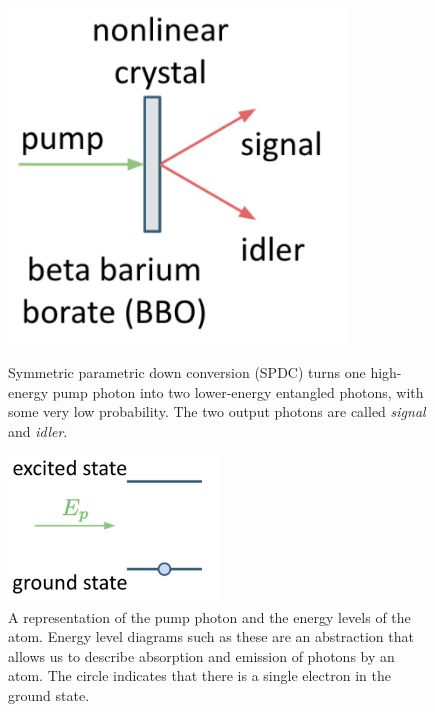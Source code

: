 \begin{figure}[H]
    \centering
    \includegraphics[width=0.8\textwidth]{lesson4/pump.pdf}
    \label{fig:spdc}
    
        \caption[Symmetric parametric down conversion (SPDC)]{Symmetric parametric down conversion (SPDC) turns one high-energy pump photon into two lower-energy entangled photons, with some very low probability. The two output photons are called \emph{signal} and \emph{idler}.}
    
\end{figure}

\begin{figure}[H]
    \centering
    \includegraphics[width=0.5\textwidth]{lesson4/state1.pdf}
    
        \caption[pump photon and the energy levels of the atom]{A representation of the pump photon and the energy levels of the atom. Energy level diagrams such as these are an abstraction that allows us to describe absorption and emission of photons by an atom. The circle indicates that there is a single electron in the ground state. }
    
    \label{fig:spdc-energy-levels}
\end{figure}

